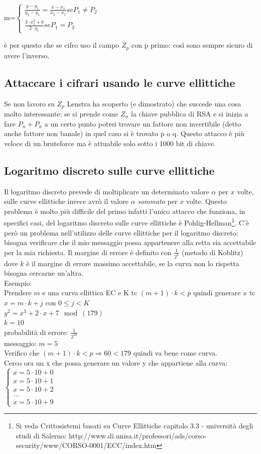\documentclass[10pt,a4paper]{article}
\begin{document}
m=$
\begin{cases}
\frac{y-y_1}{y_2-y_1}=\frac{x-x_1}{x_2-x_1} se P_1 \not= P_2\\
\frac{3\cdot x_1^2+b}{2\cdot y_1} se P_1 = P_2
\end{cases}$

è per questo che se cifro uso il campo $Z_p$ con p primo: così sono sempre sicuro di avere l'inverso.

\subsection{Attaccare i cifrari usando le curve ellittiche}
Se non lavoro su $Z_p$ Lenstra ha scoperto (e dimostrato) che succede una cosa molto interessante: se si prende come $Z_n$ la chiave pubblica di RSA e si inizia a fare $P_n+P_n$ a un certo punto potrei trovare un fattore non invertibile (detto anche fattore non banale) in quel caso si è trovato p o q. Questo attacco è più veloce di un bruteforce ma è attuabile solo sotto i 1000 bit di chiave.

\subsection{Logaritmo discreto sulle curve ellittiche}
Il logaritmo discreto prevede di moltiplicare un determinato valore $\alpha$ per $x$ volte, sulle curve ellittiche invece avrò il valore $\alpha$ \textit{sommato} per $x$ volte. Questo problema è molto più difficile del primo infatti l'unico attacco che funziona, in specifici casi, del logaritmo discreto sulle curve ellittiche è Pohlig-Hellman\footnote{Si veda Crittosistemi basati su Curve Ellittiche capitolo 3.3 - università degli studi di Salerno: http://www.di.unisa.it/professori/ads/corso-security/www/CORSO-0001/ECC/index.htm}. C'è però un problema nell'utilizzo delle curve ellittiche per il logaritmo discreto: bisogna verificare che il mio messaggio possa appartenere alla retta sia accettabile per la mia richiesta. Il margine di errore è definito con $\frac{1}{2^k}$ (metodo di Koblitz) dove $k$ è il margine di errore massimo accettabile, se la curva non lo rispetta bisogna cercarne un'altra.\\
Esempio:\\
Prendere $m$ e una curva ellittica EC e K tc $(m+1)\cdot k < p$ quindi generare $x$ tc $x=m\cdot k +j$ con
$0\leq j < K$\\

$y^2=x^3+2\cdot x+7 \mod(179)$\\
$k=10$\\
probabilità di errore: $\frac{1}{2^{10}}$\\
messaggio: $m=5$\\
Verifico che $(m+1)\cdot k < p \Rightarrow 60<179$ quindi va bene come curva.\\
Cerco ora un x che possa generare un valore y che appartiene alla curva:\\
$\begin{cases}
x=5\cdot10+0\\
x=5\cdot10+1\\
x=5\cdot10+2\\
...\\
x=5\cdot10+9
\end{cases}
$
\end{document}
